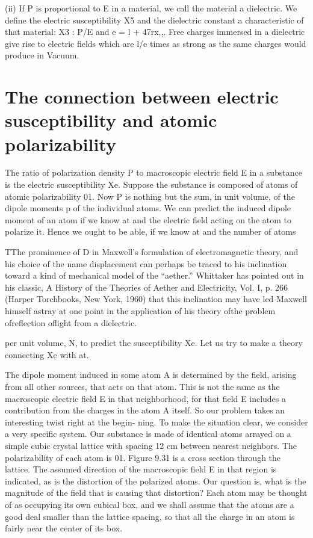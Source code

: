 {{(ii) If P is proportional to E in a material, we call the material
a dielectric. We define the electric susceptibility X5 and the
dielectric constant a characteristic of that material:
X3 : P/E and e = l + 47rx,,. Free charges immersed in
a dielectric give rise to electric fields which are l/e times
as strong as the same charges would produce in Vacuum.

\section{The connection between electric susceptibility and atomic polarizability}

The ratio of polarization density P to macroscopic electric field E
in a substance is the electric susceptibility Xe. Suppose the substance
is composed of atoms of atomic polarizability 01. Now P is nothing
but the sum, in unit volume, of the dipole moments p of the individual
atoms. We can predict the induced dipole moment of an atom if
we know at and the electric field acting on the atom to polarize it.
Hence we ought to be able, if we know at and the number of atoms

TThe prominence of D in Maxwell's formulation of electromagnetic theory, and his
choice of the name displacement can perhaps be traced to his inclination toward a
kind of mechanical model of the ``aether.'' Whittaker has pointed out in his classic,
A History of the Theories of Aether and Electricity, Vol. I, p. 266 (Harper Torchbooks,
New York, 1960) that this inclination may have led Maxwell himself astray at one
point in the application of his theory ofthe problem ofreflection oflight from a dielectric.

 
 

 

per unit volume, N, to predict the susceptibility Xe. Let us try to
make a theory connecting Xe with at.

The dipole moment induced in some atom A is determined by the
field, arising from all other sources, that acts on that atom. This is
not the same as the macroscopic electric field E in that neighborhood,
for that field E includes a contribution from the charges in the atom A
itself. So our problem takes an interesting twist right at the begin-
ning. To make the situation clear, we consider a very specific system.
Our substance is made of identical atoms arrayed on a simple cubic
crystal lattice with spacing 12 cm between nearest neighbors. The
polarizability of each atom is 01. Figure 9.31 is a cross section
through the lattice. The assumed direction of the macroscopic field
E in that region is indicated, as is the distortion of the polarized
atoms. Our question is, what is the magnitude of the field that is
causing that distortion? Each atom may be thought of as occupying
its own cubical box, and we shall assume that the atoms are a good
deal smaller than the lattice spacing, so that all the charge in an atom
is fairly near the center of its box.

}}
